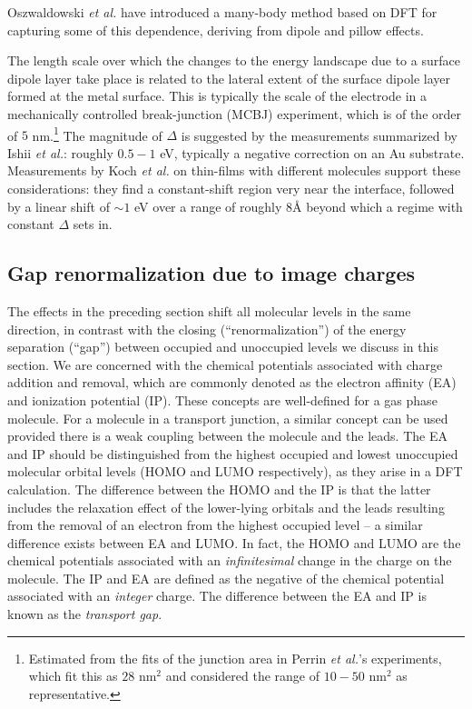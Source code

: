 \documentclass[aip,jcp,a4paper,reprint,floatfix,superscriptaddress]{revtex4-1}
\newcommand{\etal}{\emph{et al.}\xspace}
\begin{document}
Oszwaldowski \etal have introduced a many-body method based on DFT\cite{Oszwaldowski2003} for capturing some of this dependence, deriving from dipole and pillow effects. 

The length scale over which the changes to the energy landscape due to a surface dipole layer take place is related to the lateral extent of the surface dipole layer formed at the metal surface. This is typically the scale of the electrode in a mechanically controlled break-junction (MCBJ) experiment, which is of the order of $5$ nm.\footnote{Estimated from the fits of the junction area in Perrin \etal's experiments\cite{Perrin2013}, which fit this as $28$ nm$^2$ and considered the range of $10-50$ nm$^2$ as representative.}
The magnitude of $\Delta$ is suggested by the measurements summarized by Ishii \etal: roughly $0.5-1$ eV, typically a negative correction on an Au substrate. %
Measurements by Koch \etal\cite{Duhm2008,Broker2010,Niederhausen2011} on thin-films with different molecules support these considerations: they find a constant-shift region very near the interface, followed by a linear shift of $\sim1$ eV over a range of roughly $8$\AA\xspace beyond which a regime with constant $\Delta$ sets in.

\subsection{Gap renormalization due to image charges}\label{image_model}

The effects in the preceding section shift all molecular levels in the same direction, in contrast with the closing (``renormalization'') of the energy separation (``gap'') between occupied and unoccupied levels we discuss in this section. 
We are concerned with the chemical potentials associated with charge addition and removal, which are commonly denoted as the electron affinity (EA) and ionization potential (IP). These concepts are well-defined for a gas phase molecule. For a molecule in a transport junction, a similar concept 
can be used provided there is a weak coupling between the molecule and the leads. The EA and IP should be distinguished 
from the highest occupied and lowest unoccupied molecular orbital levels (HOMO and LUMO respectively), as they arise in a DFT calculation.
The difference between the HOMO and the IP is that the latter includes the relaxation effect of the lower-lying orbitals and the leads 
resulting from the removal 
of an electron from the highest occupied level -- a similar difference exists between EA and LUMO. 
In fact, the HOMO and LUMO are the chemical potentials associated with an \emph{infinitesimal} change in the charge on the molecule. The 
IP and EA are defined as the negative of the chemical potential associated with an \emph{integer} charge.
The difference between the EA and IP is
known as the \emph{transport gap}.
\end{document}
